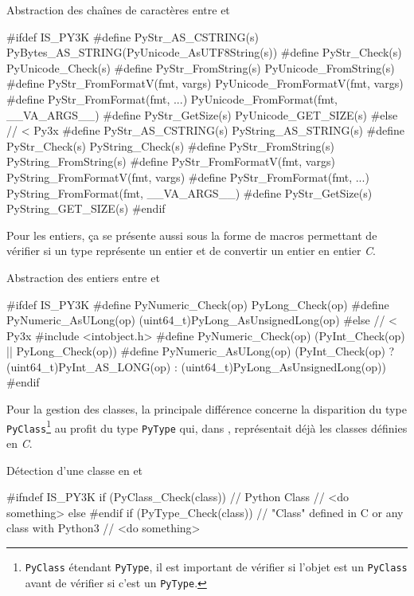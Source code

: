   \begin{listing}[H]
    \caption{Abstraction des chaînes de caractères entre  et }
\begin{ccode}
#ifdef IS_PY3K
#define PyStr_AS_CSTRING(s) PyBytes_AS_STRING(PyUnicode_AsUTF8String(s))
#define PyStr_Check(s) PyUnicode_Check(s)
#define PyStr_FromString(s) PyUnicode_FromString(s)
#define PyStr_FromFormatV(fmt, vargs) PyUnicode_FromFormatV(fmt, vargs)
#define PyStr_FromFormat(fmt, ...) PyUnicode_FromFormat(fmt, __VA_ARGS__)
#define PyStr_GetSize(s) PyUnicode_GET_SIZE(s)
#else // < Py3x
#define PyStr_AS_CSTRING(s) PyString_AS_STRING(s)
#define PyStr_Check(s) PyString_Check(s)
#define PyStr_FromString(s) PyString_FromString(s)
#define PyStr_FromFormatV(fmt, vargs) PyString_FromFormatV(fmt, vargs)
#define PyStr_FromFormat(fmt, ...) PyString_FromFormat(fmt, __VA_ARGS__)
#define PyStr_GetSize(s) PyString_GET_SIZE(s)
#endif
\end{ccode}
  \end{listing}
  
Pour les entiers, ça se présente aussi sous la forme de macros permettant de vérifier si un type \Python représente un entier et de convertir un entier \Python en entier \emph{C}.

  \begin{listing}[H]
    \caption{Abstraction des entiers entre  et }
\begin{ccode}
#ifdef IS_PY3K
#define PyNumeric_Check(op) PyLong_Check(op)
#define PyNumeric_AsULong(op) (uint64_t)PyLong_AsUnsignedLong(op)
#else // < Py3x
#include <intobject.h>
#define PyNumeric_Check(op) (PyInt_Check(op) || PyLong_Check(op))
#define PyNumeric_AsULong(op) (PyInt_Check(op) ? (uint64_t)PyInt_AS_LONG(op) : (uint64_t)PyLong_AsUnsignedLong(op))
#endif
\end{ccode}
  \end{listing} 
  
Pour la gestion des classes, la principale différence concerne la disparition du type \verb|PyClass|\footnote{\verb?PyClass? étendant \verb?PyType?, il est important de vérifier si l'objet est un \verb?PyClass? avant de vérifier si c'est un \verb?PyType?.} au profit du type \verb|PyType| qui, dans , représentait déjà les classes définies en \emph{C}.

  \begin{listing}[H]
    \caption{Détection d'une classe en  et }
\begin{ccode}
#ifndef IS_PY3K
if (PyClass_Check(class)) {
	// Python Class
	// <do something>
} else
#endif
if (PyType_Check(class)) {
	// "Class" defined in C or any class with Python3
	// <do something>
}
\end{ccode}
  \end{listing}
  
